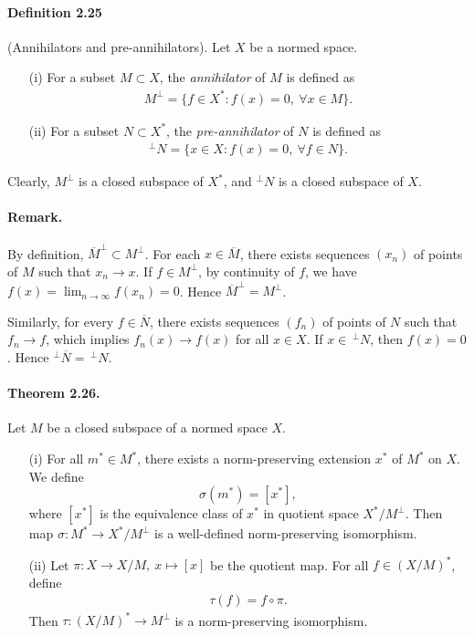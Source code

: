 \documentclass{article}
\begin{document}
\paragraph{Definition 2.25\label{def:2.25}} (Annihilators and pre-annihilators). Let $X$ be a normed space.
\begin{itemize}
\item[(i)] For a subset $M\subset X$, the \textit{annihilator} of $M$ is defined as
\begin{align*}
	M^\perp = \{f\in X^*:f(x)=0,\ \forall x\in M\}.
\end{align*}
\item[(ii)] For a subset $N\subset X^*$, the \textit{pre-annihilator} of $N$ is defined as
\begin{align*}
	^\perp N = \{x\in X:f(x)=0,\ \forall f\in N\}.
\end{align*}
\end{itemize}
Clearly, $M^\perp$ is a closed subspace of $X^*$, and $^\perp N$ is a closed subspace of $X$.

\paragraph{Remark.} By definition, $\overline{M}^\perp\subset M^\perp$. For each $x\in \overline{M}$, there exists sequences $(x_n)$ of points of $M$ such that $x_n\to x$. If $f\in M^\perp$, by continuity of $f$, we have $f(x)=\lim_{n\to\infty} f(x_n)=0$. Hence $\overline{M}^\perp = M^\perp$.

Similarly, for every $f\in\overline{N}$, there exists sequences $(f_n)$ of points of $N$ such that $f_n\to f$, which implies $f_n(x)\to f(x)$ for all $x\in X$. If $x\in\,^\perp N$, then $f(x)=0$. Hence $^\perp\overline{N}=\,^\perp N$.

\paragraph{Theorem 2.26.\label{thm:2.26}} Let $M$ be a closed subspace of a normed space $X$.
\begin{itemize}
	\item[(i)] For all $m^*\in M^*$, there exists a norm-preserving extension $x^*$ of $M^*$ on $X$. We define 
	$$\sigma(m^*)=[x^*],$$ 
	where $[x^*]$ is the equivalence class of $x^*$ in quotient space $X^*/M^\perp$. Then map $\sigma:M^*\to X^*/M^\perp$ is a well-defined norm-preserving isomorphism.
	\item[(ii)] Let $\pi:X\to X/M,\ x\mapsto[x]$ be the quotient map. For all $f\in(X/M)^*$, define
	\begin{align*}
		\tau(f) = f\circ\pi.
	\end{align*}
    Then $\tau:(X/M)^*\to M^\perp$ is a norm-preserving isomorphism.
\end{itemize}
\end{document}
